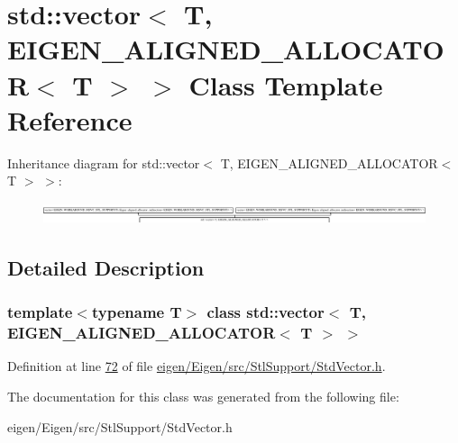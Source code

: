 \hypertarget{classstd_1_1vector_3_01_t_00_01_e_i_g_e_n___a_l_i_g_n_e_d___a_l_l_o_c_a_t_o_r_3_01_t_01_4_01_4}{}\section{std\+:\+:vector$<$ T, E\+I\+G\+E\+N\+\_\+\+A\+L\+I\+G\+N\+E\+D\+\_\+\+A\+L\+L\+O\+C\+A\+T\+OR$<$ T $>$ $>$ Class Template Reference}
\label{classstd_1_1vector_3_01_t_00_01_e_i_g_e_n___a_l_i_g_n_e_d___a_l_l_o_c_a_t_o_r_3_01_t_01_4_01_4}
Inheritance diagram for std\+:\+:vector$<$ T, E\+I\+G\+E\+N\+\_\+\+A\+L\+I\+G\+N\+E\+D\+\_\+\+A\+L\+L\+O\+C\+A\+T\+OR$<$ T $>$ $>$\+:\begin{figure}[H]
\begin{center}
\leavevmode
\includegraphics[height=0.635641cm]{classstd_1_1vector_3_01_t_00_01_e_i_g_e_n___a_l_i_g_n_e_d___a_l_l_o_c_a_t_o_r_3_01_t_01_4_01_4}
\end{center}
\end{figure}


\subsection{Detailed Description}
\subsubsection*{template$<$typename T$>$\newline
class std\+::vector$<$ T, E\+I\+G\+E\+N\+\_\+\+A\+L\+I\+G\+N\+E\+D\+\_\+\+A\+L\+L\+O\+C\+A\+T\+O\+R$<$ T $>$ $>$}



Definition at line \hyperlink{eigen_2_eigen_2src_2_stl_support_2_std_vector_8h_source_l00072}{72} of file \hyperlink{eigen_2_eigen_2src_2_stl_support_2_std_vector_8h_source}{eigen/\+Eigen/src/\+Stl\+Support/\+Std\+Vector.\+h}.



The documentation for this class was generated from the following file\+:\begin{DoxyCompactItemize}
\item 
eigen/\+Eigen/src/\+Stl\+Support/\+Std\+Vector.\+h\end{DoxyCompactItemize}
